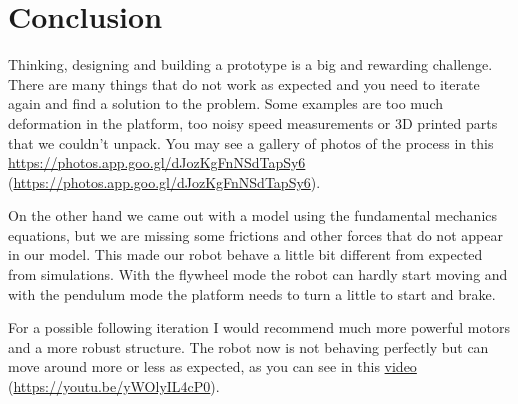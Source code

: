 \section{Conclusion}
Thinking, designing and building a prototype is a big and rewarding challenge.
There are many things that do not work as expected and you need to iterate again
and find a solution to the problem. Some examples are too much deformation in the platform,
too noisy speed measurements or 3D printed parts that we couldn't unpack. You may see a gallery of photos
of the process in this \href{link}{https://photos.app.goo.gl/dJozKgFnNSdTapSy6} (\href{https://photos.app.goo.gl/dJozKgFnNSdTapSy6}{https://photos.app.goo.gl/dJozKgFnNSdTapSy6}).

On the other hand we came out with a model using the fundamental mechanics equations, but we are missing
some frictions and other forces that do not appear in our model. This made our robot behave a little bit
different from expected from simulations. With the flywheel mode the robot can hardly start moving and with
the pendulum mode the platform needs to turn a little to start and brake.

For a possible following iteration I would recommend much more powerful motors and a more robust structure.
The robot now is not behaving perfectly but can move around more or less as expected, as you can see in this
\href{https://youtu.be/yWOlyIL4cP0}{video} (\href{https://youtu.be/yWOlyIL4cP0}{https://youtu.be/yWOlyIL4cP0}).